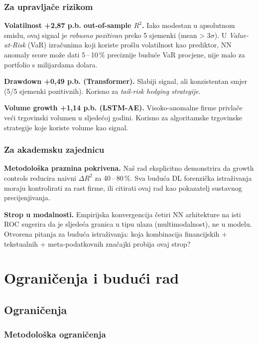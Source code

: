 \documentclass[diplomskirad,authoryear]{fer}
\begin{document}
\subsection{Za upravljače rizikom}

\textbf{Volatilnost +2,87 p.b. out-of-sample $R^2$.} Iako modestan u apsolutnom smislu, ovaj signal je \emph{robusno pozitivan} preko 5 sjemenki (mean > 3$\sigma$). U \emph{Value-at-Risk} (VaR) izračunima koji koriste prošlu volatilnost kao prediktor, NN anomaly score može dati 5\,--\,10\,\% preciznije buduće VaR procjene, nije malo za portfolio s milijardama dolara.

\textbf{Drawdown +0,49 p.b. (Transformer).} Slabiji signal, ali konzistentan smjer (5/5 sjemenki pozitivnih). Korisno za \emph{tail-risk hedging strategije}.

\textbf{Volume growth +1,14 p.b. (LSTM-AE).} Visoko-anomalne firme privlače veći trgovinski volumen u sljedećoj godini. Korisno za algoritamske trgovinske strategije koje koriste volume kao signal.

\subsection{Za akademsku zajednicu}

\textbf{Metodološka praznina pokrivena.} Naš rad eksplicitno demonstrira da growth controls reducira naivni $\Delta R^2$ za 40\,--\,80\,\%. Sva buduća DL forenzička istraživanja moraju kontrolirati za rast firme, ili citirati ovaj rad kao pokazatelj sustavnog precijenjivanja.

\textbf{Strop u modalnosti.} Empirijska konvergencija četiri NN arhitekture na isti ROC sugerira da je sljedeća granica u tipu ulaza (multimodalnost), ne u modelu. Otvorena pitanja za buduća istraživanja: koja kombinacija financijskih + tekstualnih + meta-podatkovnih značajki probija ovaj strop?

\chapter{Ograničenja i budući rad}

\section{Ograničenja}

\subsection{Metodološka ograničenja}
\end{document}
